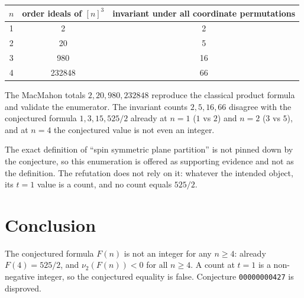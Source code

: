 \documentclass[11pt]{article}
\theoremstyle{definition}
\begin{document}
\begin{center}
\begin{tabular}{c|c|c}
$n$ & order ideals of $[n]^{3}$ & invariant under all coordinate permutations \\
\hline
1 & 2     & 2   \\
2 & 20    & 5   \\
3 & 980   & 16  \\
4 & 232848 & 66
\end{tabular}
\end{center}

The MacMahon totals $2,20,980,232848$ reproduce the classical product formula
and validate the enumerator. The invariant counts $2,5,16,66$ disagree with the
conjectured formula $1,3,15,525/2$ already at $n=1$ ($1$ vs $2$) and $n=2$
($3$ vs $5$), and at $n=4$ the conjectured value is not even an integer.

The exact definition of ``spin symmetric plane partition'' is not pinned down
by the conjecture, so this enumeration is offered as supporting evidence and
not as the definition. The refutation does not rely on it: whatever the
intended object, its $t=1$ value is a count, and no count equals $525/2$.

\section{Conclusion}

The conjectured formula $F(n)$ is not an integer for any $n\ge 4$: already
$F(4)=525/2$, and $\nu_{2}(F(n))<0$ for all $n\ge 4$. A count at $t=1$ is a
non-negative integer, so the conjectured equality is false. Conjecture
\texttt{00000000427} is disproved.
\end{document}
